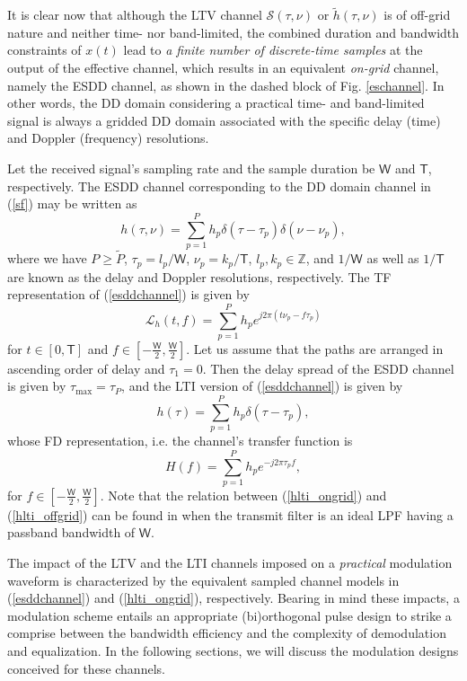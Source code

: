\documentclass[journal]{IEEEtran}
\begin{document}
It is clear now that although the LTV channel $\mathcal S(\tau,\nu)$ or $\tilde h (\tau,\nu)$ is of off-grid nature and neither time- nor band-limited, the combined duration and bandwidth constraints of $x(t)$ lead to \emph{a finite number of discrete-time samples} at the output of the effective channel, which results in an equivalent \emph{on-grid} channel, namely the ESDD channel, as shown in the dashed block of  Fig. \ref{eschannel}. {In other words, the DD domain considering a practical time- and band-limited signal is always a gridded DD domain associated with the specific delay (time) and Doppler (frequency) resolutions.}

Let the received signal's sampling rate and the sample duration be $\mathsf W$ and $\mathsf T$, respectively. The ESDD channel corresponding to the DD domain channel in (\ref{sf}) may be written as \cite{bello}
\begin{equation}\label{esddchannel}
  h(\tau,\nu)=\sum_{p=1}^{P}h_p \delta (\tau-\tau_p)\delta (\nu-\nu_p),
\end{equation}
where we have $P\ge \tilde P$, $\tau_p=l_p/\mathsf W$, $\nu_p=k_p/\mathsf T$, $l_p, k_p \in \mathbb Z$, and $1/\mathsf W$ as well as $1/\mathsf T$ are known as the delay and Doppler resolutions, respectively.
The TF representation of (\ref{esddchannel}) is given by
\begin{equation}
  \mathcal L_h(t, f)=\sum_{p=1}^{P} h_p e^{j2\pi(t\nu_p-f\tau_p)}
\end{equation}
for $t\in [0,\mathsf T]$ and $f\in [-\frac{\mathsf W}{2},\frac{\mathsf W}{2}]$.
Let us assume that the paths are arranged in ascending order of delay and $\tau_1=0$. Then the delay spread of the ESDD channel is given by $\tau_{\textrm{max}}=\tau_P$, and the LTI version of (\ref{esddchannel}) is given by
\begin{equation}\label{hlti_ongrid}
  h(\tau)=\sum_{p=1}^P h_p \delta (\tau-\tau_p),
\end{equation}
whose FD representation, i.e. the channel's transfer function is
\begin{equation}\label{Hlti_ongrid}
  H(f)=\sum_{p=1}^P h_p e^{-j2\pi \tau_pf},
\end{equation}
for $f\in [-\frac{\mathsf W}{2},\frac{\mathsf W}{2}]$. Note that the relation between (\ref{hlti_ongrid}) and (\ref{hlti_offgrid}) can be found in \cite{fwc} when the transmit filter is an ideal LPF having a passband bandwidth of $\mathsf W$.


The impact of the LTV and the LTI channels imposed on a \emph{practical} modulation waveform is characterized by the equivalent sampled channel models in (\ref{esddchannel}) and (\ref{hlti_ongrid}), respectively. Bearing in mind  these impacts, a modulation scheme entails an appropriate (bi)orthogonal pulse design to strike a comprise between the bandwidth efficiency and the complexity of demodulation and equalization.
In the following sections, we will discuss the modulation designs conceived for these channels.
\end{document}

